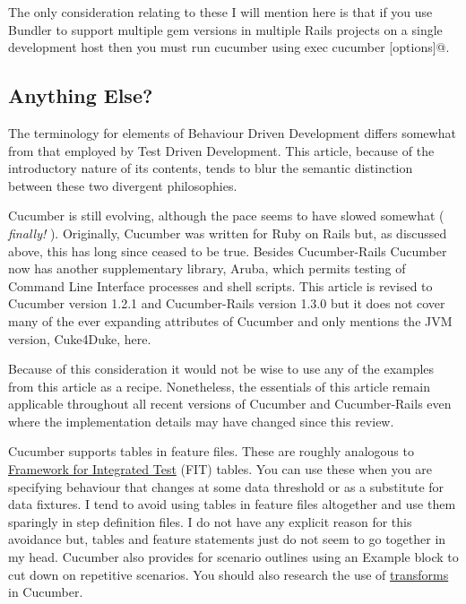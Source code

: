 \documentclass[10pt]{book}
\begin{document}
The only consideration relating to these I will mention here is that if you use Bundler to support multiple gem versions in multiple Rails projects on a single development host then you must run cucumber using \verb@bundle exec cucumber [options]@.

\subsection{Anything Else?}

The terminology for elements of Behaviour Driven Development differs somewhat from that employed by Test Driven Development.  This article, because of the introductory nature of its contents, tends to blur the semantic distinction between these two divergent philosophies.

Cucumber is still evolving, although the pace seems to have slowed somewhat ( \emph{finally!} ).  Originally, Cucumber was written for Ruby on Rails but,  as discussed above, this has long since ceased to be true. Besides Cucumber-Rails Cucumber now has another supplementary library, Aruba, which permits testing of Command Line Interface processes and shell scripts.  This article is revised to Cucumber version 1.2.1 and Cucumber-Rails version 1.3.0 but it does not cover many of the ever expanding attributes of Cucumber and only mentions the JVM version, Cuke4Duke, here.

Because of this consideration it would not be wise to use any of the examples from this article as a recipe. Nonetheless, the essentials of this article remain applicable throughout all recent versions of Cucumber and Cucumber-Rails even where the implementation details may have changed since this review.

Cucumber supports tables in feature files.  These are roughly analogous to \href{http://fit.c2.com/}{Framework for Integrated Test} (FIT) tables.  You can use these when you are specifying behaviour that changes at some data threshold or as a substitute for data fixtures.  I tend to avoid using tables in feature files altogether and use them sparingly in step definition files.  I do not have any explicit reason for this avoidance but, tables and feature statements just do not seem to go together in my head.  Cucumber also provides for scenario outlines using an Example block to cut down on repetitive scenarios.  You should also research the use of \href{http://www.engineyard.com/blog/2009/cucumber-step-argument-transforms/}{transforms} in Cucumber.
\end{document}
